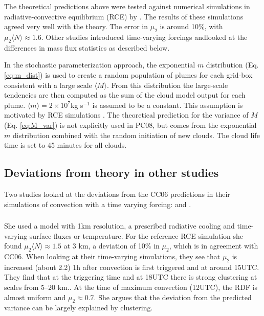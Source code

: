 \documentclass[a4paper, 12pt, draft]{article}
\begin{document}
The theoretical predictions above were tested against numerical simulations in radiative-convective equilibrium (RCE) by \cite{Cohen2006}. The results of these simulations agreed very well with the theory. The error in $\mu_2$ is around 10\%, with $\mu_2 \langle N \rangle \approx 1.6$. Other studies introduced time-varying forcings andlooked at the differences in mass flux statistics as described below.

In the \cite[][PC08]{Plant2008} stochastic parameterization approach, the exponential $m$ distribution (Eq. \ref{eq:m_dist}) is used to create a random population of plumes for each grid-box consistent with a large scale $\langle M \rangle$. From this distribution the large-scale tendencies are then computed as the sum of the cloud model output for each plume. $\langle m \rangle = 2 \times 10^7$kg s$^{-1}$ is assumed to be a constant. This assumption is motivated by RCE simulations \citep[e.g.][]{Cohen2006}. The theoretical prediction for the variance of $M$ (Eq. \ref{eq:M_var}) is not explicitly used in PC08, but comes from the exponential $m$ distribution combined with the random initiation of new clouds. The cloud life time is set to 45 minutes for all clouds. 

\subsection{Deviations from theory in other studies}
Two studies looked at the deviations from the CC06 predictions in their simulations of convection with a time varying forcing: \cite{Davies2008} and \cite{Davoudi2010}.

\subsubsection{\cite{Davies2008}}
She used a model with 1km resolution, a prescribed radiative cooling and time-varying surface fluxes or temperature. For the reference RCE simulation she found $\mu_2 \langle N \rangle \approx 1.5$ at 3 km, a deviation of 10\% in $\mu_2$, which is in agreement with CC06. When looking at their time-varying simulations, they see that $\mu_2$ is increased (about 2.2) 1h after convection is first triggered and at around 15UTC. They find that at the triggering time and at 18UTC there is strong clustering at scales from 5--20 km.. At the time of maximum convection (12UTC), the RDF is almost uniform and $\mu_2 \approx 0.7$. She argues that the deviation from the predicted variance can be largely explained by clustering. 
\end{document}
